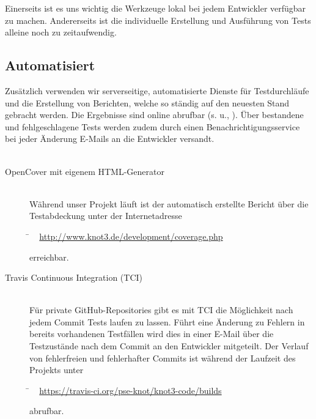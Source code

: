 Einerseits ist es uns wichtig die Werkzeuge lokal bei jedem Entwickler verfügbar zu machen. Andererseits ist die individuelle Erstellung und Ausführung von Tests alleine noch zu zeitaufwendig. 



\subsection{Automatisiert}
\label{Abschnitt:Tests:Werkzeuge:Automatisiert}

Zusätzlich verwenden wir serverseitige, automatisierte Dienste für Testdurchläufe und die Erstellung von Berichten, welche so ständig auf den neuesten Stand gebracht werden. Die Ergebnisse sind online abrufbar (s. u., ). Über bestandene und fehlgeschlagene Tests werden zudem durch einen Benachrichtigungsservice bei jeder Änderung E-Mails an die Entwickler versandt.
\\
\\


\begin{description}

	\item[OpenCover mit eigenem HTML-Generator] \hfill
	\\
	
	Während unser Projekt läuft ist der automatisch erstellte Bericht über die Testabdeckung unter der Internetadresse
	
	\begin{tabbing}
			\= ~ \href {http://www.knot3.de/development/coverage.php}
					   {http://www.knot3.de/development/coverage.php}
					   
	\end{tabbing} erreichbar.
	\\
	
	\item[Travis Continuous Integration (TCI)] \hfill
	\\
	
	Für private GitHub-Repositories gibt es mit TCI die Möglichkeit nach jedem Commit Tests laufen zu lassen.
	Führt eine Änderung zu Fehlern in bereits vorhandenen Testfällen wird dies in einer E-Mail über die Testzustände nach dem Commit an den Entwickler mitgeteilt. Der Verlauf von fehlerfreien und fehlerhafter Commits ist während der Laufzeit des Projekts unter
	
	\begin{tabbing}
			\= ~ \href {https://travis-ci.org/pse-knot/knot3-code/builds}
		    {https://travis-ci.org/pse-knot/knot3-code/builds}
		   
	\end{tabbing} abrufbar.
	\\
	

\end{description}


